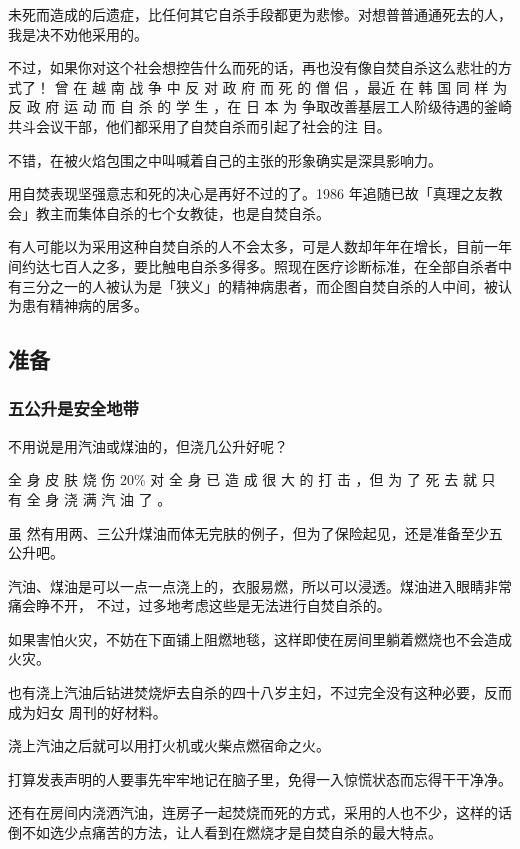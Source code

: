 \documentclass[UTF8]{ctexart}
\begin{document}
未死而造成的后遗症，比任何其它自杀手段都更为悲惨。对想普普通通死去的人，我是决不劝他采用的。

不过，如果你对这个社会想控告什么而死的话，再也没有像自焚自杀这么悲壮的方式了！
曾 在 越 南 战 争 中 反 对 政 府 而 死 的 僧 侣 ，最近 在 韩 国 同 样 为 反 政 府 运 动 而 自 杀 的 学 生 ，在 日 本 为 争取改善基层工人阶级待遇的釜崎共斗会议干部，他们都采用了自焚自杀而引起了社会的注 目。

不错，在被火焰包围之中叫喊着自己的主张的形象确实是深具影响力。

用自焚表现坚强意志和死的决心是再好不过的了。1986 年追随已故「真理之友教会」教主而集体自杀的七个女教徒，也是自焚自杀。

有人可能以为采用这种自焚自杀的人不会太多，可是人数却年年在增长，目前一年间约达七百人之多，要比触电自杀多得多。照现在医疗诊断标准，在全部自杀者中有三分之一的人被认为是「狭义」的精神病患者，而企图自焚自杀的人中间，被认为患有精神病的居多。

\subsection{准备}

\subsubsection*{五公升是安全地带}

不用说是用汽油或煤油的，但浇几公升好呢？ 

全 身 皮 肤 烧 伤 $20\%$ 对 全 身 已 造 成 很 大 的 打 击 ，但 为 了 死 去 就 只 有 全 身 浇 满 汽 油 了 。

虽 然有用两、三公升煤油而体无完肤的例子，但为了保险起见，还是准备至少五公升吧。

汽油、煤油是可以一点一点浇上的，衣服易燃，所以可以浸透。煤油进入眼睛非常痛会睁不开，
不过，过多地考虑这些是无法进行自焚自杀的。

如果害怕火灾，不妨在下面铺上阻燃地毯，这样即使在房间里躺着燃烧也不会造成火灾。

也有浇上汽油后钻进焚烧炉去自杀的四十八岁主妇，不过完全没有这种必要，反而成为妇女
周刊的好材料。

浇上汽油之后就可以用打火机或火柴点燃宿命之火。

打算发表声明的人要事先牢牢地记在脑子里，免得一入惊慌状态而忘得干干净净。

还有在房间内浇洒汽油，连房子一起焚烧而死的方式，采用的人也不少，这样的话倒不如选少点痛苦的方法，让人看到在燃烧才是自焚自杀的最大特点。
\end{document}
